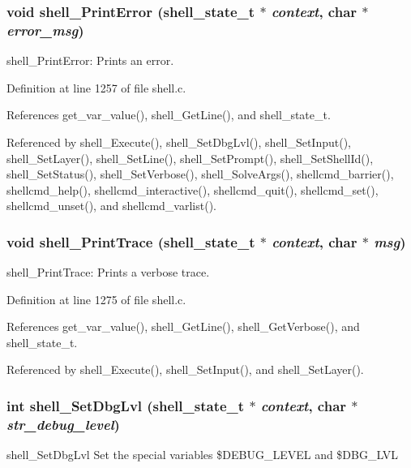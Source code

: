 \subsubsection{\setlength{\rightskip}{0pt plus 5cm}void shell\_\-Print\-Error ({\bf shell\_\-state\_\-t} $\ast$ {\em context}, char $\ast$ {\em error\_\-msg})}\label{shell_8h_a15}


shell\_\-Print\-Error: Prints an error. 

Definition at line 1257 of file shell.c.

References get\_\-var\_\-value(), shell\_\-Get\-Line(), and shell\_\-state\_\-t.

Referenced by shell\_\-Execute(), shell\_\-Set\-Dbg\-Lvl(), shell\_\-Set\-Input(), shell\_\-Set\-Layer(), shell\_\-Set\-Line(), shell\_\-Set\-Prompt(), shell\_\-Set\-Shell\-Id(), shell\_\-Set\-Status(), shell\_\-Set\-Verbose(), shell\_\-Solve\-Args(), shellcmd\_\-barrier(), shellcmd\_\-help(), shellcmd\_\-interactive(), shellcmd\_\-quit(), shellcmd\_\-set(), shellcmd\_\-unset(), and shellcmd\_\-varlist().
\subsubsection{\setlength{\rightskip}{0pt plus 5cm}void shell\_\-Print\-Trace ({\bf shell\_\-state\_\-t} $\ast$ {\em context}, char $\ast$ {\em msg})}\label{shell_8h_a16}


shell\_\-Print\-Trace: Prints a verbose trace. 

Definition at line 1275 of file shell.c.

References get\_\-var\_\-value(), shell\_\-Get\-Line(), shell\_\-Get\-Verbose(), and shell\_\-state\_\-t.

Referenced by shell\_\-Execute(), shell\_\-Set\-Input(), and shell\_\-Set\-Layer().
\subsubsection{\setlength{\rightskip}{0pt plus 5cm}int shell\_\-Set\-Dbg\-Lvl ({\bf shell\_\-state\_\-t} $\ast$ {\em context}, char $\ast$ {\em str\_\-debug\_\-level})}\label{shell_8h_a23}


shell\_\-Set\-Dbg\-Lvl Set the special variables \$DEBUG\_\-LEVEL and \$DBG\_\-LVL 

